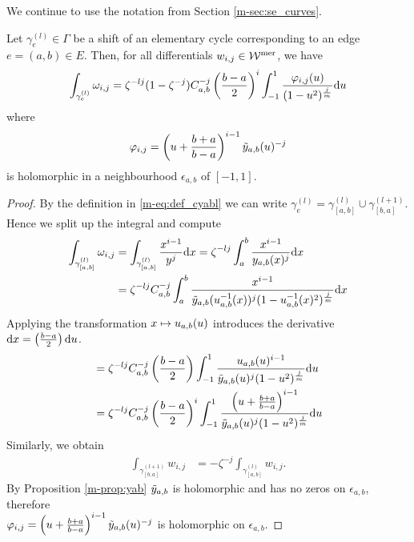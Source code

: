 \documentclass[main.tex]{subfiles}
\begin{document}
  We continue to use the notation from Section \ref{m-sec:se_curves}.

  \begin{thm}\label{thm:periods}
   Let $\gamma_e^{(l)} \in \Gamma$ be a shift of an elementary cycle corresponding
   to an edge $e = (a,b) \in E$. Then, for all differentials $w_{i,j} \in \mathcal{W}^{\text{mer}}$, we have
   \begin{equation}\label{eq:periods} 
      \int_{\gamma_e^{(l)}} \omega_{i,j}  =  \zeta^{-lj} (1-\zeta^{-j}) C_{a,b}^{-j} \left(\frac{b-a}{2}\right)^i \int_{-1}^1 \frac{\varphi_{i,j}(u)}{(1-u^2)^{\frac{j}{m}}}  \mathrm d u
   \end{equation}
   where
   \begin{equation}
    \varphi_{i,j}  = \left(u+\frac{b+a}{b-a}\right)^{i-1} \tilde{y}_{a,b}(u)^{-j}
   \end{equation}
   is holomorphic in a neighbourhood $\epsilon_{a,b}$ of $[-1,1]$.
  \end{thm}
  \begin{proof}
    By the definition in \eqref{m-eq:def_cyabl} we can write $\gamma_e^{(l)} = \gamma_{[a,b]}^{(l)} \cup \gamma_{[b,a]}^{(l+1)}$. Hence we split up the integral and compute
    \begin{align}\label{eq:thm_periods_2}
     \int_{\gamma_{[a,b]}^{(l)}} \omega_{i,j}  & =  \int_{\gamma_{[a,b]}^{(l)}} \frac{x^{i-1}}{y^j}  \mathrm d x  =  \zeta^{-lj} \int_a^b \frac{x^{i-1}}{y_{a,b}(x)^j}  \mathrm d x \\  & =
     \zeta^{-lj} C_{a,b}^{-j}   \int_a^b \frac{x^{i-1}}{\tilde{y}_{a,b}(u_{a,b}^{-1}(x))^j (1-u_{a,b}^{-1}(x)^2)^{\frac{j}{m}}}  \mathrm d x
  \end{align}
  Applying the transformation $x \mapsto u_{a,b}(u)$ introduces the derivative $\mathrm d x = \left(\frac{b-a}{2}\right) \mathrm d u$.
  \begin{align}
   & = \zeta^{-lj} C_{a,b}^{-j} \left(\frac{b-a}{2}\right) \int_{-1}^1 \frac{u_{a,b}(u)^{i-1}}{\tilde{y}_{a,b}(u)^j (1-u^2)^{\frac{j}{m}}}  \mathrm d u \\ & = 
    \zeta^{-lj} C_{a,b}^{-j} \left(\frac{b-a}{2}\right)^i \int_{-1}^1 \frac{\left(u+\frac{b+a}{b-a}\right)^{i-1}}{\tilde{y}_{a,b}(u)^j (1-u^2)^{\frac{j}{m}}}  \mathrm d u
  \end{align}
  Similarly, we obtain
  \begin{align}
        \int_{\gamma_{[b,a]}^{(l+1)}} w_{i,j}  & =  -\zeta^{-j} \int_{\gamma_{[a,b]}^{(l)}} w_{i,j}.
  \end{align}
  By Proposition \ref{m-prop:yab} $\tilde{y}_{a,b}$ is holomorphic and has no zeros on $\epsilon_{a,b}$, therefore \\ $\varphi_{i,j}  = \left(u+\frac{b+a}{b-a}\right)^{i-1} \tilde{y}_{a,b}(u)^{-j}$
  is holomorphic on $\epsilon_{a,b}$.
  \end{proof}
\end{document}
